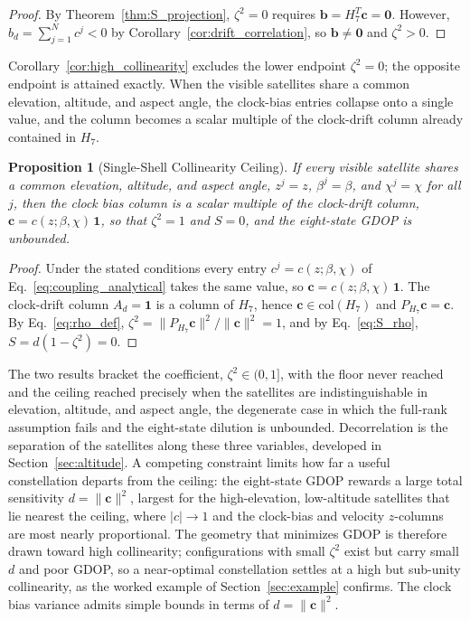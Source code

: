 \documentclass[letterpaper,times]{IONconf-v2}
\theoremstyle{plain}
\newtheorem{proposition}{Proposition}
\theoremstyle{remark}
\begin{document}
\begin{proof}
By Theorem~\ref{thm:S_projection}, $\zeta^2 = 0$ requires $\mathbf{b} = H_7^T\mathbf{c} = \mathbf{0}$. However, $b_d = \sum_{j=1}^N c^j < 0$ by Corollary~\ref{cor:drift_correlation}, so $\mathbf{b} \neq \mathbf{0}$ and $\zeta^2 > 0$.
\end{proof}

Corollary~\ref{cor:high_collinearity} excludes the lower endpoint $\zeta^2 = 0$; the opposite endpoint is attained exactly. When the visible satellites share a common elevation, altitude, and aspect angle, the clock-bias entries collapse onto a single value, and the column becomes a scalar multiple of the clock-drift column already contained in $H_7$.

\begin{proposition}[Single-Shell Collinearity Ceiling]\label{prop:collinearity_ceiling}
If every visible satellite shares a common elevation, altitude, and aspect angle, $z^j = z$, $\beta^j = \beta$, and $\chi^j = \chi$ for all $j$, then the clock bias column is a scalar multiple of the clock-drift column, $\mathbf{c} = c(z;\beta,\chi)\,\mathbf{1}$, so that $\zeta^2 = 1$ and $S = 0$, and the eight-state GDOP is unbounded.
\end{proposition}

\begin{proof}
Under the stated conditions every entry $c^j = c(z;\beta,\chi)$ of Eq.~\eqref{eq:coupling_analytical} takes the same value, so $\mathbf{c} = c(z;\beta,\chi)\,\mathbf{1}$. The clock-drift column $A_d = \mathbf{1}$ is a column of $H_7$, hence $\mathbf{c} \in \mathrm{col}(H_7)$ and $P_{H_7}\mathbf{c} = \mathbf{c}$. By Eq.~\eqref{eq:rho_def}, $\zeta^2 = \|P_{H_7}\mathbf{c}\|^2/\|\mathbf{c}\|^2 = 1$, and by Eq.~\eqref{eq:S_rho}, $S = d(1-\zeta^2) = 0$.
\end{proof}

The two results bracket the coefficient, $\zeta^2 \in (0,1]$, with the floor never reached and the ceiling reached precisely when the satellites are indistinguishable in elevation, altitude, and aspect angle, the degenerate case in which the full-rank assumption fails and the eight-state dilution is unbounded. Decorrelation is the separation of the satellites along these three variables, developed in Section~\ref{sec:altitude}. A competing constraint limits how far a useful constellation departs from the ceiling: the eight-state GDOP rewards a large total sensitivity $d = \|\mathbf{c}\|^2$, largest for the high-elevation, low-altitude satellites that lie nearest the ceiling, where $|c| \to 1$ and the clock-bias and velocity $z$-columns are most nearly proportional. The geometry that minimizes GDOP is therefore drawn toward high collinearity; configurations with small $\zeta^2$ exist but carry small $d$ and poor GDOP, so a near-optimal constellation settles at a high but sub-unity collinearity, as the worked example of Section~\ref{sec:example} confirms. The clock bias variance admits simple bounds in terms of $d = \|\mathbf{c}\|^2$.
\end{document}
